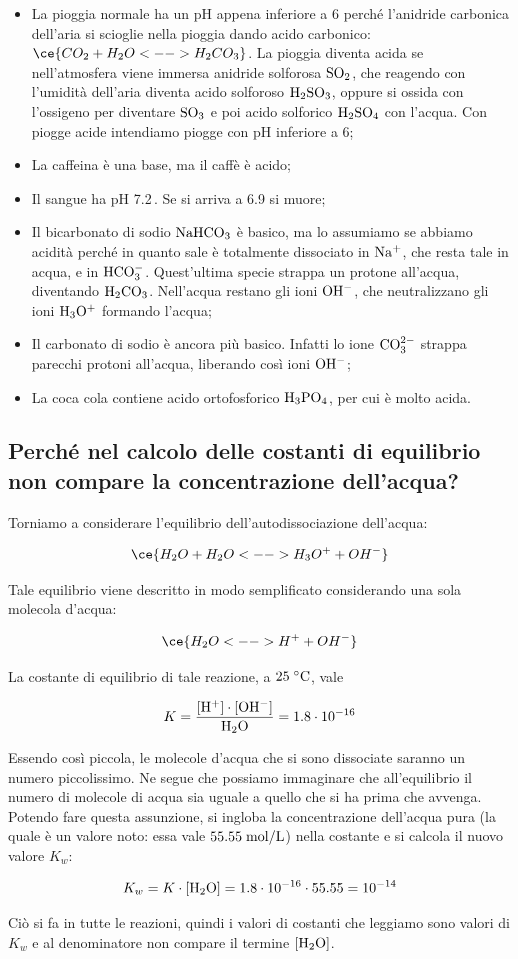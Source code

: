 \begin{itemize}
    \item La pioggia normale ha un pH appena inferiore a 6 perché l'anidride carbonica dell'aria si scioglie nella pioggia dando acido carbonico: $\ce{CO_2 + H_2O <--> H_2CO_3}$. La pioggia diventa acida se nell'atmosfera viene immersa anidride solforosa $\rm SO_2$, che reagendo con l'umidità dell'aria diventa acido solforoso $\rm H_2SO_3$, oppure si ossida con l'ossigeno per diventare $\rm SO_3$ e poi acido solforico $\rm H_2SO_4$ con l'acqua. Con piogge acide intendiamo piogge con pH inferiore a 6;
    \item La caffeina è una base, ma il caffè è acido;
    \item Il sangue ha pH 7.2\,. Se si arriva a 6.9 si muore;
    \item Il bicarbonato di sodio $\rm NaHCO_3$ è basico, ma lo assumiamo se abbiamo acidità perché in quanto sale è totalmente dissociato in $\rm Na^+$, che resta tale in acqua, e in $\rm HCO_3^-$. Quest'ultima specie strappa un protone all'acqua, diventando $\rm H_2CO_3$. Nell'acqua restano gli ioni $\rm OH^-$, che neutralizzano gli ioni $\rm H_3O^+$ formando l'acqua;
    \item Il carbonato di sodio è ancora più basico. Infatti lo ione $\rm CO_3^{2-}$ strappa parecchi protoni all'acqua, liberando così ioni $\rm OH^-$;
    \item La coca cola contiene acido ortofosforico $\rm H_3PO_4$, per cui è molto acida.
\end{itemize}

\subsection{Perché nel calcolo delle costanti di equilibrio non compare la concentrazione dell'acqua?}

\vspace{0.2cm}Torniamo a considerare l'equilibrio dell'autodissociazione dell'acqua:

$$\ce{H_2O + H_2O <--> H_3O^+ + OH^-}$$

Tale equilibrio viene descritto in modo semplificato considerando una sola molecola d'acqua:

$$\ce{H_2O <--> H^+ + OH^-}$$

La costante di equilibrio di tale reazione, a $25 \; ^{\circ} \rm C$, vale

$$K=\rm \frac{[H^+]\cdot[OH^-]}{H_2O}=1.8 \cdot 10^{-16}$$

Essendo così piccola, le molecole d'acqua che si sono dissociate saranno un numero piccolissimo. Ne segue che possiamo immaginare che all'equilibrio il numero di molecole di acqua sia uguale a quello che si ha prima che avvenga. Potendo fare questa assunzione, si ingloba la concentrazione dell'acqua pura (la quale è un valore noto: essa vale $55.55 \; \rm mol/L$) nella costante e si calcola il nuovo valore $K_w$:

$$K_w=K \cdot [\rm H_2O]=1.8 \cdot 10^{-16} \cdot 55.55=10^{-14}$$

Ciò si fa in tutte le reazioni, quindi i valori di costanti che leggiamo sono valori di $K_w$ e al denominatore non compare il termine $\rm [H_2O]$.
